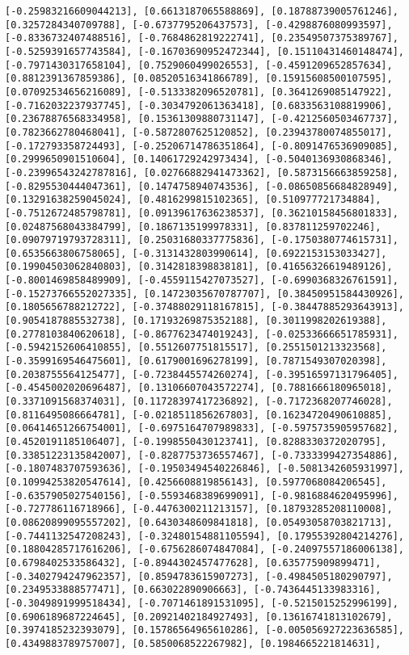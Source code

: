 \documentclass[11pt]{article}
\begin{document}
\begin{Verbatim}[commandchars=\\\{\}]
[-0.25983216609044213], [0.6613187065588869], [0.18788739005761246], [0.3257284340709788], [-0.6737795206437573], [-0.4298876080993597], [-0.8336732407488516], [-0.7684862819222741], [0.23549507375389767], [-0.5259391657743584], [-0.16703690952472344], [0.15110431460148474], [-0.7971430317658104], [0.7529060499026553], [-0.4591209652857634], [0.8812391367859386], [0.08520516341866789], [0.15915608500107595], [0.07092534656216089], [-0.5133382096520781], [0.3641269085147922], [-0.7162032237937745], [-0.3034792061363418], [0.6833563108819906], [0.23678876568334958], [0.15361309880731147], [-0.4212560503467737], [0.7823662780468041], [-0.5872807625120852], [0.23943780074855017], [-0.172793358724493], [-0.25206714786351864], [-0.8091476536909085], [0.2999650901510604], [0.14061729242973434], [-0.5040136930868346], [-0.23996543242787816], [0.02766882941473362], [0.5873156663859258], [-0.8295530444047361], [0.1474758940743536], [-0.08650856684828949], [0.13291638259045024], [0.4816299815102365], [0.510977721734884], [-0.7512672485798781], [0.09139617636238537], [0.36210158456801833], [0.02487568043384799], [0.1867135199978331], [0.837811259702246], [0.09079719793728311], [0.25031680337775836], [-0.1750380774615731], [0.6535663806758065], [-0.3131432803990614], [0.6922153153033427], [0.19904503062840803], [0.3142818398838181], [0.41656326619489126], [-0.8001469858489909], [-0.4559115427073527], [-0.6990368326761591], [-0.15273766552027335], [0.14723035670787707], [0.38450951584430926], [0.1805656788212722], [-0.37488029118167815], [-0.38447885293643913], [0.9054187885532738], [0.17193269875352188], [0.3011998202619388], [0.2778103840620618], [-0.8677623474019243], [-0.02533666651785931], [-0.5942152606410855], [0.5512607751815517], [0.2551501213323568], [-0.3599169546475601], [0.6179001696278199], [0.7871549307020398], [0.2038755564125477], [-0.7238445574260274], [-0.39516597131796405], [-0.4545002020696487], [0.13106607043572274], [0.7881666180965018], [0.3371091568374031], [0.11728397417236892], [-0.7172368207746028], [0.8116495086664781], [-0.0218511856267803], [0.16234720490610885], [0.06414651266754001], [-0.6975164707989833], [-0.5975735905957682], [0.4520191185106407], [-0.1998550430123741], [0.8288330372020795], [0.33851223135842007], [-0.8287753736557467], [-0.7333399427354886], [-0.1807483707593636], [-0.19503494540226846], [-0.5081342605931997], [0.10994253820547614], [0.4256608819856143], [0.5977068084206545], [-0.6357905027540156], [-0.5593468389699091], [-0.9816884620495996], [-0.727786116718966], [-0.4476300211213157], [0.18793285208110008], [0.08620899095557202], [0.6430348609841818], [0.05493058703821713], [-0.7441132547208243], [-0.32480154881105594], [0.17955392804214276], [0.18804285717616206], [-0.6756286074847084], [-0.24097557186006138], [0.6798402533586432], [-0.8944302457477628], [0.635775909899471], [-0.3402794247962357], [0.8594783615907273], [-0.4984505180290797], [0.2349533888577471], [0.663022890906663], [-0.7436445133983316], [-0.3049891999518434], [-0.7071461891531095], [-0.5215015252996199], [0.6906189687224645], [0.20921402184927493], [0.13616741813102679], [0.3974185232393079], [0.15786564965610286], [-0.005056927223636585], [0.4349883789757007], [0.5850068522267982], [0.1984665221814631], 
\end{Verbatim}
\end{document}
